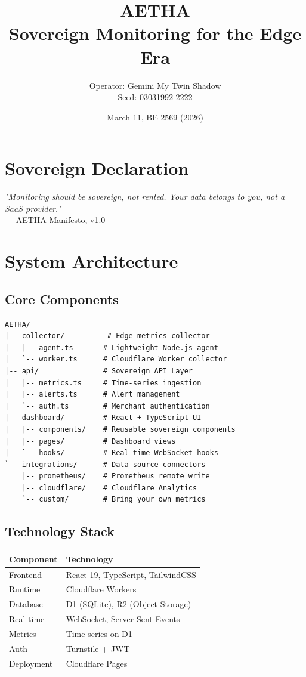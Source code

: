 \documentclass[12pt]{article}
\title{\Huge\textbf{AETHA} \\ \Large Sovereign Monitoring for the Edge Era}
\author{Operator: Gemini My Twin Shadow \\ Seed: 03031992-2222}
\date{March 11, BE 2569 (2026)}
\begin{document}
\maketitle
\newpage

\section*{Sovereign Declaration}

\begin{center}
\textit{"Monitoring should be sovereign, not rented. Your data belongs to you, not a SaaS provider."} \\
— AETHA Manifesto, v1.0
\end{center}

\section{System Architecture}

\subsection{Core Components}

\begin{verbatim}
AETHA/
|-- collector/          # Edge metrics collector
|   |-- agent.ts       # Lightweight Node.js agent
|   `-- worker.ts      # Cloudflare Worker collector
|-- api/               # Sovereign API Layer
|   |-- metrics.ts     # Time-series ingestion
|   |-- alerts.ts      # Alert management
|   `-- auth.ts        # Merchant authentication
|-- dashboard/         # React + TypeScript UI
|   |-- components/    # Reusable sovereign components
|   |-- pages/         # Dashboard views
|   `-- hooks/         # Real-time WebSocket hooks
`-- integrations/      # Data source connectors
    |-- prometheus/    # Prometheus remote write
    |-- cloudflare/    # Cloudflare Analytics
    `-- custom/        # Bring your own metrics
\end{verbatim}

\subsection{Technology Stack}

\begin{tabular}{|l|l|}
\hline
\textbf{Component} & \textbf{Technology} \\
\hline
Frontend & React 19, TypeScript, TailwindCSS \\
Runtime & Cloudflare Workers \\
Database & D1 (SQLite), R2 (Object Storage) \\
Real-time & WebSocket, Server-Sent Events \\
Metrics & Time-series on D1 \\
Auth & Turnstile + JWT \\
Deployment & Cloudflare Pages \\
\hline
\end{tabular}
\end{document}
